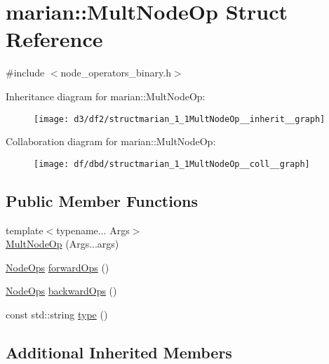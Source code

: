 \hypertarget{structmarian_1_1MultNodeOp}{}\section{marian\+:\+:Mult\+Node\+Op Struct Reference}
\label{structmarian_1_1MultNodeOp}


{\ttfamily \#include $<$node\+\_\+operators\+\_\+binary.\+h$>$}



Inheritance diagram for marian\+:\+:Mult\+Node\+Op\+:
\nopagebreak
\begin{figure}[H]
\begin{center}
\leavevmode
\texttt{[image: d3/df2/structmarian\_1\_1MultNodeOp\_\_inherit\_\_graph]}
\end{center}
\end{figure}


Collaboration diagram for marian\+:\+:Mult\+Node\+Op\+:
\nopagebreak
\begin{figure}[H]
\begin{center}
\leavevmode
\texttt{[image: df/dbd/structmarian\_1\_1MultNodeOp\_\_coll\_\_graph]}
\end{center}
\end{figure}
\subsection*{Public Member Functions}
\begin{DoxyCompactItemize}
\item 
{\footnotesize template$<$typename... Args$>$ }\\\hyperlink{structmarian_1_1MultNodeOp_ac436d5c700e29f08e37d962820762157}{Mult\+Node\+Op} (Args...\+args)
\item 
\hyperlink{namespacemarian_a4956376218cc236016c20bc4071470da}{Node\+Ops} \hyperlink{structmarian_1_1MultNodeOp_a659fc65e22c0921a06bd167b0b1c2102}{forward\+Ops} ()
\item 
\hyperlink{namespacemarian_a4956376218cc236016c20bc4071470da}{Node\+Ops} \hyperlink{structmarian_1_1MultNodeOp_a27aa4d7f39e4ba64e3be883ca6dfaf45}{backward\+Ops} ()
\item 
const std\+::string \hyperlink{structmarian_1_1MultNodeOp_a69109e1f4c13884564ca7ba27eb5cf49}{type} ()
\end{DoxyCompactItemize}
\subsection*{Additional Inherited Members}


